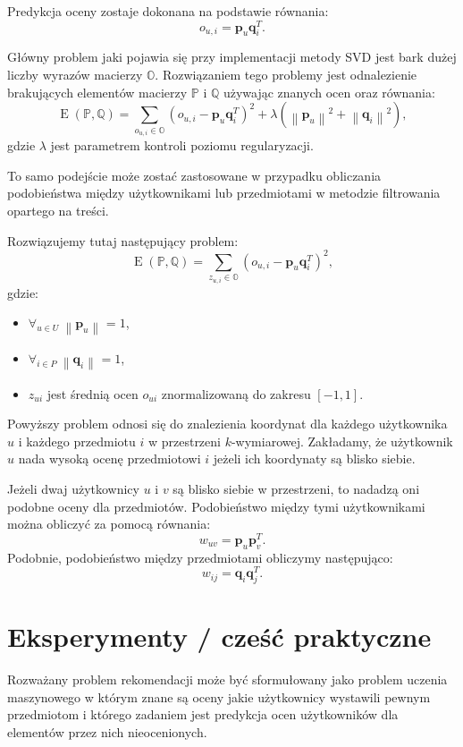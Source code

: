 \documentclass[12pt,a4paper]{report}
\newcommand{\norm}[2][]{\left\| {#2} \right\|_{#1}}
\newcommand{\e}[1]{\operatorname{E}\left({#1} \right)}
\begin{document}
Predykcja oceny zostaje dokonana na podstawie równania:
$$
o_{u,i} = \mathbf{p}_u \mathbf{q}_i^T.
$$

Główny problem jaki pojawia się przy implementacji metody SVD jest bark dużej liczby wyrazów macierzy $\mathbb{O}$. 
Rozwiązaniem tego problemy jest odnalezienie brakujących elementów macierzy $\mathbb{P}$ i $\mathbb{Q}$ używając znanych ocen oraz równania:
$$
\e{\mathbb{P}, \mathbb{Q}} = \sum_{o_{u,i} \in \mathbb{O}}(o_{u,i} - \mathbf{p}_u\mathbf{q}_i^T)^2 + \lambda(\norm{\mathbf{p}_u}^2 + \norm{\mathbf{q}_i}^2),
$$
gdzie $\lambda$ jest parametrem kontroli poziomu regularyzacji.

To samo podejście może zostać zastosowane w przypadku obliczania podobieństwa między użytkownikami lub przedmiotami w metodzie filtrowania opartego na treści.

Rozwiązujemy tutaj następujący problem:
$$
\e{\mathbb{P}, \mathbb{Q}} = \sum_{z_{u,i} \in \mathbb{O}}(o_{u,i} - \mathbf{p}_u\mathbf{q}_i^T)^2,
$$
gdzie:
\begin{itemize}
\item $\forall_{u \in \mathit{U}} \: \norm{\mathbf{p}_u} = 1$,
\item $\forall_{i \in \mathit{P}} \: \norm{\mathbf{q}_i} = 1$,
\item $z_{ui}$ jest średnią ocen $o_{ui}$ znormalizowaną do zakresu $[-1,1]$.
\end{itemize}

Powyższy problem odnosi się do znalezienia koordynat dla każdego użytkownika $u$ i każdego przedmiotu $i$ w przestrzeni $k$-wymiarowej. Zakładamy, że użytkownik $u$ nada wysoką ocenę przedmiotowi $i$ jeżeli ich koordynaty są blisko siebie. 

Jeżeli dwaj użytkownicy $u$ i $v$ są blisko siebie w przestrzeni, to  nadadzą oni podobne oceny dla przedmiotów. Podobieństwo między tymi użytkownikami można obliczyć za pomocą równania:
$$
w_{uv} = \mathbf{p}_u \mathbf{p}_v^T.
$$
Podobnie, podobieństwo między przedmiotami obliczymy następująco:
$$
w_{ij} = \mathbf{q}_i \mathbf{q}_j^T.
$$


\chapter{Eksperymenty / cześć praktyczne}

Rozważany problem rekomendacji może być sformułowany jako problem uczenia maszynowego w którym znane są oceny jakie użytkownicy wystawili pewnym przedmiotom i którego zadaniem jest predykcja ocen użytkowników dla elementów przez nich nieocenionych. 
\end{document}

